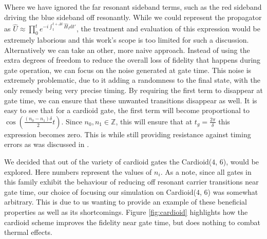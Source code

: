 \documentclass[12pt,twoside]{report}
\begin{document}
Where we have ignored the far resonant sideband terms, such as the red sideband driving the blue sideband off resonantly. While we could represent the propagator as $\hat{U}\approx \prod_0^t e^{-i\int_{t}^{t + \Delta t}\hat{H}_I\text{d}t'}$, the treatment and evaluation of this expression would be extremely laborious and this work's scope is too limited for such a discussion. Alternatively we can take an other, more naive approach. Instead of using the extra degrees of freedom to reduce the overall loss of fidelity that happens during gate operation, we can focus on the noise generated at gate time. This noise is extremely problematic, due to it adding a randomness to the final state, with the only remedy being very precise timing. By requiring the first term to disappear at gate time, we can ensure that these unwanted transitions disappear as well. It is easy to see that for a cardioid gate, the first term will become proportional to $\cos(\frac{(n_0 - n_1)\delta}{2}t)$. Since $n_0, n_1 \in \mathbb{Z}$, this will ensure that at $t_g = \frac{2\pi}{\delta}$ this expression becomes zero. This is while still providing resistance against timing errors as was discussed in \cite{Cardioid}.

We decided that out of the variety of cardioid gates the Cardioid($4$, $6$), would be explored. Here numbers represent the values of $n_i$. As a note, since all gates in this family exhibit the behaviour of reducing off resonant carrier transitions near gate time, our choice of focusing our simulation on Cardioid($4$, $6$) was somewhat arbitrary. This is due to us wanting to provide an example of these beneficial properties as well as its shortcomings. Figure \ref{fig:cardioid} highlights how the cardioid scheme improves the fidelity near gate time, but does nothing to combat thermal effects.
\end{document}
